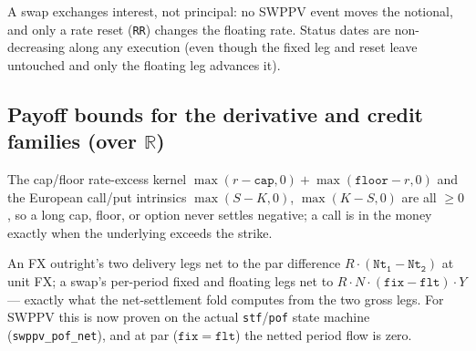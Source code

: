 \begin{theorem}\label{thm:swap-inv}
        \leanok
        A swap exchanges interest, not principal: no SWPPV event moves the
        notional, and only a rate reset (\texttt{RR}) changes the floating rate.
        Status dates are non-decreasing along any execution (even though the
        fixed leg and reset leave  untouched and only the floating leg
        advances it).
\end{theorem}

\subsection{Payoff bounds for the derivative and credit families (over $\mathbb{R}$)}

\begin{theorem}\label{thm:intrinsic}
        \leanok
        The cap/floor rate-excess kernel
        $\max(r - \mathtt{cap}, 0) + \max(\mathtt{floor} - r, 0)$ and the
        European call/put intrinsics $\max(S - K, 0)$, $\max(K - S, 0)$ are all
        $\ge 0$, so a long cap, floor, or option never settles negative; a call
        is in the money exactly when the underlying exceeds the strike.
\end{theorem}

\begin{theorem}\label{thm:conservation-deriv}
        \leanok
        An FX outright's two delivery legs net to the par difference
        $R \cdot (\mathtt{Nt_1} - \mathtt{Nt_2})$ at unit FX; a swap's per-period
        fixed and floating legs net to $R \cdot N \cdot (\mathtt{fix} -
        \mathtt{flt}) \cdot Y$ --- exactly what the net-settlement fold computes
        from the two gross legs.  For SWPPV this is now proven on the actual
        \texttt{stf}/\texttt{pof} state machine (\texttt{swppv\_pof\_net}), and at
        par ($\mathtt{fix}=\mathtt{flt}$) the netted period flow is zero.
\end{theorem}

